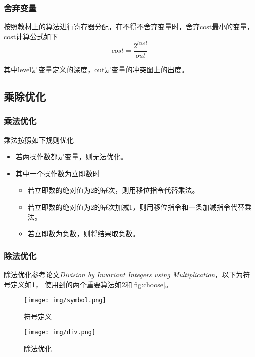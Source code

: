 \subsubsection{舍弃变量}

按照教材上的算法进行寄存器分配，在不得不舍弃变量时，舍弃cost最小的变量，cost计算公式如下
\begin{equation*}
    cost = \frac{2^{level}}{out}
\end{equation*}

其中level是变量定义的深度，out是变量的冲突图上的出度。
    

\subsection{乘除优化}

\subsubsection{乘法优化}
乘法按照如下规则优化
\begin{itemize}
    \item 若两操作数都是变量，则无法优化。
    \item 其中一个操作数为立即数时
        \begin{itemize}
            \item 若立即数的绝对值为2的幂次，则用移位指令代替乘法。
            \item 若立即数的绝对值为2的幂次加减1，则用移位指令和一条加减指令代替乘法。
            \item 若立即数为负数，则将结果取负数。
        \end{itemize}
\end{itemize}

\subsubsection{除法优化}

除法优化参考论文\textit{Division by Invariant Integers using Multiplication}，以下为符号定义如\ref{fig:symbol}，
使用到的两个重要算法如\ref{fig:div}和\ref{fig:choose}。

\begin{figure}[H]
	\centering
	\texttt{[image: img/symbol.png]}
	\caption{符号定义}
	\label{fig:symbol}
\end{figure}

\begin{figure}[H]
	\centering
	\texttt{[image: img/div.png]}
	\caption{除法优化}
	\label{fig:div}
\end{figure}

